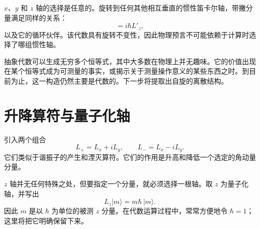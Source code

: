 \(x\)、\(y\) 和 \(z\) 轴的选择是任意的。旋转到任何其他相互垂直的惯性笛卡尔轴，带撇分量满足同样的关系：
\begin{equation}
[L'_x,L'_y]=i\hbar L'_z,
\end{equation}
以及它的循环伙伴。该代数具有旋转不变性，因此物理预言不可能依赖于计算时选择了哪组惯性轴。

\begin{classroomqa}
\end{classroomqa}

抽象代数可以生成无穷多个恒等式，其中大多数在物理上并无趣味。它的价值出现在某个恒等式成为可测量的事实，或揭示关于测量操作意义的某些东西之时。到目前为止，这一构造仍然主要是代数的。下一步将提取出自旋的离散结构。

\begin{classroomqa}
\end{classroomqa}

\section{升降算符与量子化轴}

引入两个组合
\begin{equation}
L_+=L_x+iL_y,
\qquad
L_-=L_x-iL_y.
\end{equation}
它们类似于谐振子的产生和湮灭算符。它们的作用是升高和降低一个选定的角动量分量。

\(z\) 轴并无任何特殊之处，但要指定一个分量，就必须选择一根轴。取 \(z\) 为量子化轴，并写出
\begin{equation}
L_z\lvert m\rangle=m\hbar\,\lvert m\rangle.
\end{equation}
因此 \(m\) 是以 \(\hbar\) 为单位的被测 \(z\) 分量。在代数运算过程中，常常方便地令 \(\hbar=1\)；这里将把它明确保留下来。

